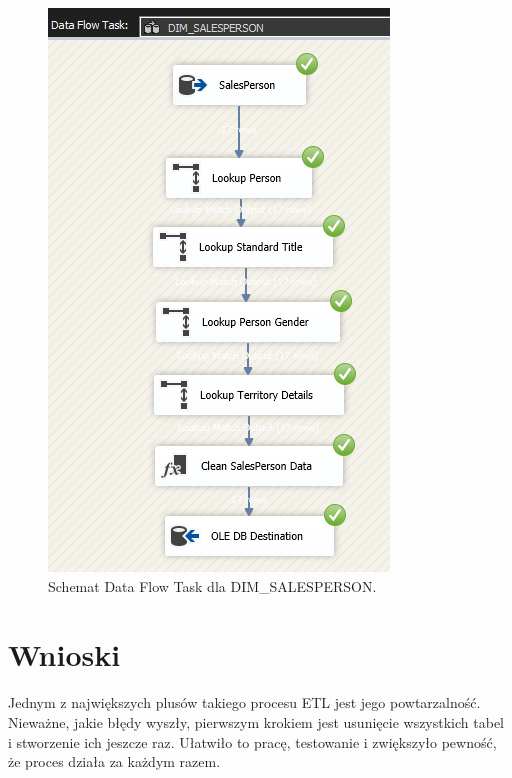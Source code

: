\documentclass[a4paper,12pt]{article}
\begin{document}
\begin{figure}[H]
    \centering
    \includegraphics[width=\textwidth]{images/5_salesperson.png}
    \caption{Schemat Data Flow Task dla DIM\_SALESPERSON.}
\end{figure}

\section{Wnioski}

Jednym z największych plusów takiego procesu ETL jest jego powtarzalność. Nieważne, jakie błędy wyszły, pierwszym krokiem jest usunięcie wszystkich tabel i stworzenie ich jeszcze raz. Ułatwiło to pracę, testowanie i zwiększyło pewność, że proces działa za każdym razem.
\end{document}
